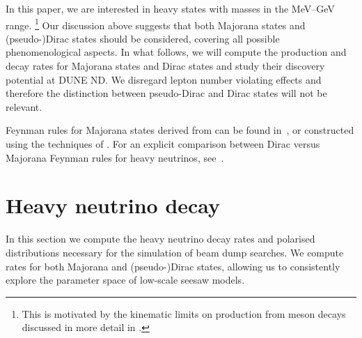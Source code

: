 In this paper, we are interested in heavy states with masses in the MeV--GeV range.%
\footnote{This is motivated by the kinematic limits on production from meson decays discussed in more detail in .} %
Our discussion above suggests that both Majorana states and (pseudo-)Dirac states should be considered, %
covering all possible phenomenological aspects.
In what follows, we will compute the production and decay rates for Majorana states %
and Dirac states and study their discovery potential at DUNE ND.
We disregard lepton number violating effects and therefore the distinction between pseudo-Dirac and Dirac states will not be relevant.

Feynman rules for Majorana states derived from  can be found in~\cite{Atre:2009rg},
or constructed using the techniques of . 
For an explicit comparison between Dirac versus Majorana Feynman rules for heavy neutrinos, see~.
\section{Heavy neutrino decay}
\label{sec:decay}

In this section we compute the heavy neutrino decay rates and polarised %
distributions necessary for the simulation of beam dump searches.
We compute rates for both Majorana and (pseudo-)Dirac states, allowing us to consistently %
explore the parameter space of low-scale seesaw models.
%

